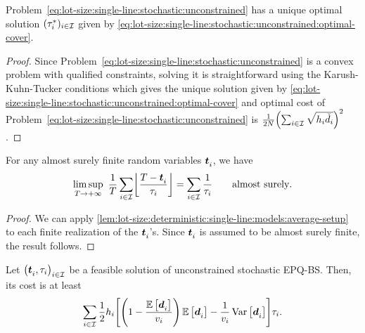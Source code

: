 \begin{lem}\label{lem:lot-size:single-line:stochastic:unconstrained:optimality}
Problem~\eqref{eq:lot-size:single-line:stochastic:unconstrained} has a unique optimal solution $(\tau_i^*)_{i\in\mathcal{I}}$ given by \cref{eq:lot-size:single-line:stochastic:unconstrained:optimal-cover}.
\end{lem}


\begin{proof}
Since Problem~\eqref{eq:lot-size:single-line:stochastic:unconstrained} is a convex problem with qualified constraints, solving it is straightforward using the Karush-Kuhn-Tucker conditions which gives the unique solution given by \cref{eq:lot-size:single-line:stochastic:unconstrained:optimal-cover} and optimal cost of Problem~\eqref{eq:lot-size:single-line:stochastic:unconstrained} is $\frac{1}{2\nbsetups}\bracket{\sum_{i\in\REF}\sqrt{\holding_i\check{\demand}_i}}^2$.
\end{proof}


\begin{lem}\label{lem:lot-size:stochastic:single-line:models:average-setup}
For any almost surely finite random variables $\va t_i$, we have
\begin{equation}
\limsup_{\horizon\rightarrow+\infty}\ \frac{1}{\horizon} \sum_{i\in\REF} \left\lfloor\frac{\horizon-\va t_i}{\cover_i}\right\rfloor
=
\sum_{i\in\REF} \frac{1}{\cover_i}\qquad \mbox{almost surely}.
\end{equation}
\end{lem}


\begin{proof}
We can apply \cref{lem:lot-size:deterministic:single-line:models:average-setup} to each finite realization of the $\va t_i$'s.
Since $\va t_i$ is assumed to be almost surely finite, the result follows.
\end{proof}


\begin{lem}\label{lem:lot-size:stochastic:single-line:models:ZIO}
Let $\bracket{\va t_i,\cover_i}_{i\in\REF}$ be a feasible solution of unconstrained stochastic EPQ-BS.
Then, its cost is at least
\begin{equation}
  \sum_{i\in\REF}\frac{1}{2}\holding_i\sqbracket{\bracket{1-\frac{\espe\sqbracket{\va\demand_i}}{\rate_i}}\espe\sqbracket{\va\demand_i} - \frac{1}{\rate_i}\vari\sqbracket{\va\demand_i}}\cover_i.
\end{equation}
\end{lem}


